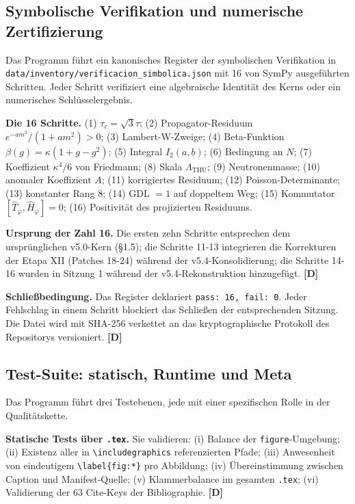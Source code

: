 ﻿\documentclass[11pt,letterpaper]{article}
\begin{document}
\subsection{Symbolische Verifikation und numerische Zertifizierung}
Das Programm führt ein kanonisches Register der symbolischen Verifikation in \texttt{data/inventory/verificacion\_simbolica.json} mit 16 von SymPy ausgeführten Schritten. Jeder Schritt verifiziert eine algebraische Identität des Kerns oder ein numerisches Schlüsselergebnis.

\textbf{Die 16 Schritte.} (1) $\tau_c = \sqrt{3}\tau$; (2) Propagator-Residuum $e^{-am^2}/(1+am^2) > 0$; (3) Lambert-W-Zweige; (4) Beta-Funktion $\beta(g) = \kappa(1+g-g^2)$; (5) Integral $I_2(a,b)$; (6) Bedingung an $N$; (7) Koeffizient $\kappa^4/6$ von Friedmann; (8) Skala $\Lambda_{\mathrm{THU}}$; (9) Neutronenmasse; (10) anomaler Koeffizient $A$; (11) korrigiertes Residuum; (12) Poisson-Determinante; (13) konstanter Rang 8; (14) GDL $= 1$ auf doppeltem Weg; (15) Kommutator $[\hat{T}_\varphi, \hat{H}_\varphi] = 0$; (16) Positivität des projizierten Residuums.

\textbf{Ursprung der Zahl 16.} Die ersten zehn Schritte entsprechen dem ursprünglichen v5.0-Kern (§1.5); die Schritte 11-13 integrieren die Korrekturen der Etapa XII (Patches 18-24) während der v5.4-Konsolidierung; die Schritte 14-16 wurden in Sitzung 1 während der v5.4-Rekonstruktion hinzugefügt. \textbf{[D]}

\textbf{Schließbedingung.} Das Register deklariert \texttt{pass: 16, fail: 0}. Jeder Fehlschlag in einem Schritt blockiert das Schließen der entsprechenden Sitzung. Die Datei wird mit SHA-256 verkettet an das kryptographische Protokoll des Repositorys versioniert. \textbf{[D]}
\subsection{Test-Suite: statisch, Runtime und Meta}
Das Programm führt drei Testebenen, jede mit einer spezifischen Rolle in der Qualitätskette.

\textbf{Statische Tests über \texttt{.tex}.} Sie validieren: (i) Balance der \texttt{figure}-Umgebung; (ii) Existenz aller in \texttt{\textbackslash includegraphics} referenzierten Pfade; (iii) Anwesenheit von eindeutigem \texttt{\textbackslash label\{fig:*\}} pro Abbildung; (iv) Übereinstimmung zwischen Caption und Manifest-Quelle; (v) Klammerbalance im gesamten \texttt{.tex}; (vi) Validierung der 63 Cite-Keys der Bibliographie. \textbf{[D]}
\end{document}
